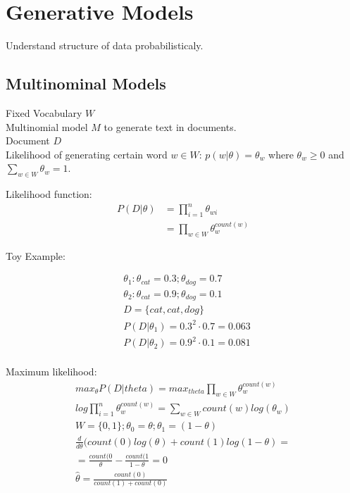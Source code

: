 \section{Generative Models}
Understand structure of data probabilisticaly.

\subsection{Multinominal Models}

Fixed Vocabulary $W$\\

Multinomial model $M$ to generate text in documents.\\

Document $D$\\

Likelihood of generating certain word $w \in W$: $p(w|\theta)=\theta_w$ where $\theta_w \geq 0$ and $\sum _{w\in W} \theta _ w = 1$.

Likelihood function:\\

\begin{align*}
P(D|\theta) &= \prod_{i=1}^n \theta_{wi}\\
&= \prod_{w \in W} \theta_w^{count(w)}
\end{align*}

Toy Example:

\begin{align*}
&\theta_1: \theta_{cat}=0.3; \theta_{dog}=0.7\\
&\theta_2: \theta_{cat}=0.9; \theta_{dog}=0.1\\
&D = \{cat,cat,dog\}\\
&P(D|\theta_1)= 0.3^2 \cdot 0.7 = 0.063\\
&P(D|\theta_2)= 0.9^2 \cdot 0.1 = 0.081\\
\end{align*}

Maximum likelihood:\\
\begin{align*}
max_{\theta}P(D|theta) = max_{theta} \prod_{w \in W} \theta_w^{count(w)}\\
log \prod_{i=1}^n \theta_w^{count(w)} = \sum_{w \in W} count(w) log(\theta_w)\\
W=\{0,1\}; \theta_0=\theta; \theta_1=(1-\theta)\\
\frac{d}{d \theta}(count(0) log(\theta) + count(1)log(1-\theta) =\\
= \frac{count(0}{\theta} - \frac{count(1}{1-\theta} = 0\\
\hat{\theta}=\frac{count(0)}{count(1)+count(0)}
\end{align*}

